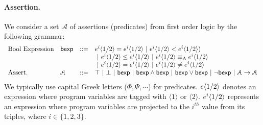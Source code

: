\documentclass[a4paper,11pt]{article}
\begin{document}
\paragraph{Assertion.} We consider a set $\mathcal{A}$ of assertions (predicates) from first order logic by the following grammar:
\[
\begin{array}{llll}
%
\mbox{Bool Expression} & \bexp & :: = & 
\expr^{i}\langle 1 / 2 \rangle = \expr^i\langle 1 / 2 \rangle 
 ~|~ \expr^i\langle 1 / 2 \rangle < \expr^i\langle 1 / 2 \rangle) \\
 & & &
 ~|~ \expr^i\langle 1 / 2 \rangle \leq \expr^i\langle 1 / 2 \rangle
 ~|~ \expr^i\langle 1 / 2 \rangle \lameq \expr^i\langle 1 / 2 \rangle
	\\
& & &
 ~|~ \expr^i\langle 1 / 2 \rangle = \expr^i\langle 1 / 2 \rangle
 ~|~ \expr^i\langle 1 / 2 \rangle \neq \expr^i\langle 1 / 2 \rangle
	\\
%
\mbox{Assert.} & \mathcal{A} & ::= & \top ~|~ \bot ~|~ \bexp 
	~|~ \bexp \land \bexp ~|~ \bexp \lor \bexp ~|~ \neg \bexp
	~|~ \mathcal{A} \imply \mathcal{A}
\end{array}
\]
%
We typically use capital Greek letters ($\Phi, \Psi, \cdots$) for predicates. 
%
$e\langle 1 / 2 \rangle$ denotes an expression where program variables are tagged with $\langle 1 \rangle$ or $\langle 2 \rangle$.
%
$e^i\langle 1 / 2 \rangle$ represents an expression where program variables are projected to the $i^{th}$ value from its triples, where $i \in \{1, 2, 3\}$.
%
\end{document}
